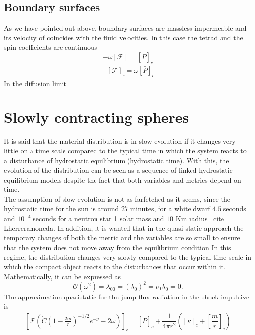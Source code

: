 \documentclass[notitlepage,letterpaper, 10pt]{article}
\begin{document}
\subsection{Boundary surfaces}
As we have pointed out above, boundary surfaces are massless impermeable and its velocity of coincides with the fluid velocities. In this case the tetrad and the spin coefficients are continuous 
\begin{equation}
    -\omega \left[ \mathcal{F} \right]= \left[ \bar{P} \right]_{c} 
\end{equation}
\begin{eqnarray}
   - \left[ \mathcal{F} \right]_c = \omega  \left[ \bar{P}
   \right]_{c} 
\end{eqnarray}
In the diffusion limit 
\section{Slowly contracting spheres}
It is said that the material distribution is in slow evolution if it changes very little on a time scale compared to the typical time in which the system reacts to a disturbance of hydrostatic equilibrium (hydrostatic time). With this, the evolution of the distribution can be seen as a sequence of linked hydrostatic equilibrium models despite the fact that both variables and metrics depend on time. \\
The assumption of slow evolution is not as farfetched as it seems, since the hydrostatic time for the sun is around $ 27 $ minutes, for a white dwarf $ 4.5 $ seconds and $ 10 ^{-4}$  seconds for a neutron star 1 solar mass and $ 10 $ Km radius \ cite {Lherreramoneda}.
In addition, it is wanted that in the quasi-static approach the temporary changes of both the metric and the variables are so small to ensure that the system does not move away from the equilibrium condition
In this regime, the distribution changes very slowly compared to the typical time scale in which the compact object reacts to the disturbances that occur within it. Mathematically, it can be expressed as
\begin{equation}
\mathcal{O} (\omega^{2}) = \lambda_{00} = \left (\lambda_0 \right)^ 2 = \nu_{0} \lambda_{0} = 0.
\label{cuasiestatic}
\end{equation}
The approximation quasistatic for the jump flux radiation in the  shock impulsive is
\begin{eqnarray}
    \left[ \mathcal{F}\left( \dot{C}\left( 1- \frac{2m}{r} \right)^{-1/2}e^{-\nu}-2\omega \right)  \right]_{c} =  \left[\bar{P} \right]_{c}+ \dfrac{1}{4 \pi r^{2}} \left( \left[ \kappa \right]_c + \left[\dfrac{m}{r} \right]_c\right)
\end{eqnarray}
\end{document}
